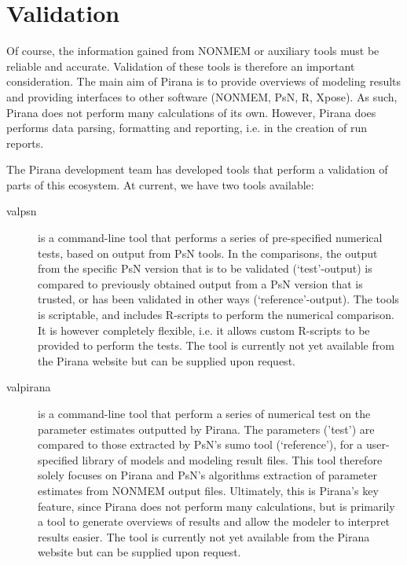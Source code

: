 {{{{%
\newpage  %
\thispagestyle{empty}
\mbox{}

\chapter{Validation}
Of course, the information gained from NONMEM or auxiliary tools must be
reliable and accurate. Validation of these tools is therefore an important consideration.
The main aim of Pirana is to provide overviews of modeling results and
providing interfaces to other software (NONMEM, PsN, R, Xpose). As such, Pirana does not perform many calculations of its own. However,
Pirana does performs data parsing, formatting and reporting, i.e. in the creation of run reports.

\noindent The Pirana development team has developed tools that perform a validation of parts of this
ecosystem. At current, we have two tools available:

\begin{description}
\item[valpsn] is a command-line tool that performs a
  series of pre-specified numerical tests, based on output from PsN
  tools. In the comparisons, the output from the specific PsN version
  that is to be validated (`test'-output) is compared to previously
  obtained output from a PsN version that is trusted, or has been
  validated in other ways (`reference'-output). The tools is
  scriptable, and includes R-scripts to perform the numerical
  comparison. It is however completely flexible, i.e. it allows custom
  R-scripts to be provided to perform the tests. The tool is currently
  not yet available from the Pirana website but can be supplied upon request.
\item[valpirana] is a command-line tool that perform a
  series of numerical test on the parameter estimates outputted by
  Pirana. The parameters ('test') are compared to those extracted by
  PsN's sumo tool (`reference'), for a user-specified library of
  models and modeling result files. This tool therefore solely focuses
  on Pirana and PsN's algorithms extraction of parameter estimates
  from NONMEM output files. Ultimately, this is Pirana's key feature,
  since Pirana does not perform many calculations, but is primarily a
  tool to generate overviews of results and allow the modeler to
  interpret results easier. The tool is currently
  not yet available from the Pirana website but can be supplied upon request.
\end{description}

}}}}
